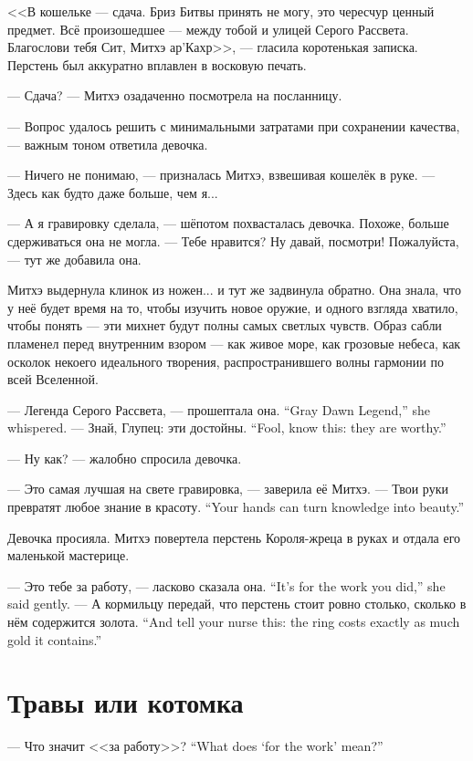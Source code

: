 <<В кошельке --- сдача.
Бриз Битвы принять не могу, это чересчур ценный предмет.
Всё произошедшее --- между тобой и улицей Серого Рассвета.
Благослови тебя Сит, Митхэ ар'Кахр>>, --- гласила коротенькая записка.
Перстень был аккуратно вплавлен в восковую печать.

--- Сдача? --- Митхэ озадаченно посмотрела на посланницу.

--- Вопрос удалось решить с минимальными затратами при сохранении качества, --- важным тоном ответила девочка.

--- Ничего не понимаю, --- призналась Митхэ, взвешивая кошелёк в руке.
--- Здесь как будто даже больше, чем я...

--- А я гравировку сделала, --- шёпотом похвасталась девочка.
Похоже, больше сдерживаться она не могла.
--- Тебе нравится?
Ну давай, посмотри!
Пожалуйста, --- тут же добавила она.

Митхэ выдернула клинок из ножен... и тут же задвинула обратно.
Она знала, что у неё будет время на то, чтобы изучить новое оружие, и одного взгляда хватило, чтобы понять --- эти михнет будут полны самых светлых чувств.
Образ сабли пламенел перед внутренним взором --- как живое море, как грозовые небеса, как осколок некоего идеального творения, распространившего волны гармонии по всей Вселенной.

{--- Легенда Серого Рассвета, --- прошептала она.}
{``Gray Dawn Legend,'' she whispered.}
{--- Знай, Глупец: эти достойны.}
{``Fool, know this: they are worthy.''}

--- Ну как? --- жалобно спросила девочка.

--- Это самая лучшая на свете гравировка, --- заверила её Митхэ.
{--- Твои руки превратят любое знание в красоту.}
{``Your hands can turn knowledge into beauty.''}

Девочка просияла.
Митхэ повертела перстень Короля-жреца в руках и отдала его маленькой мастерице.

{--- Это тебе за работу, --- ласково сказала она.}
{``It's for the work you did,'' she said gently.}
{--- А кормильцу передай, что перстень стоит ровно столько, сколько в нём содержится золота.}
{``And tell your nurse this: the ring costs exactly as much gold it contains.''}

\section{Травы или котомка}

{--- Что значит <<за работу>>?}
{``What does `for the work' mean?''}

